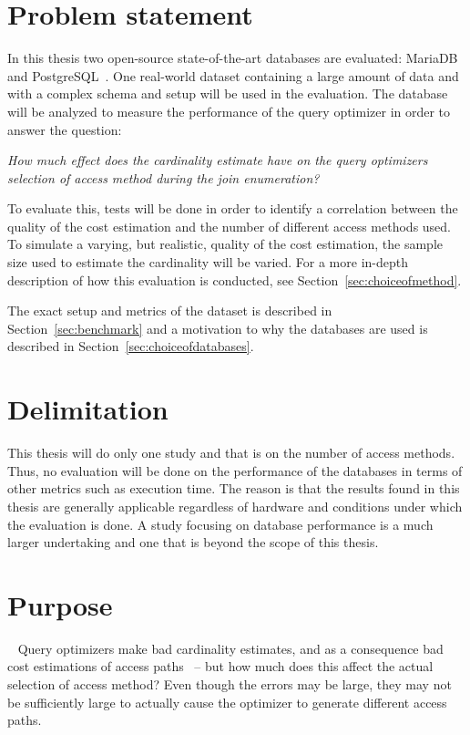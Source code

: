 \section{Problem statement}
In this thesis two open-source state-of-the-art databases are evaluated:
MariaDB~\cite{mariadb_m} and PostgreSQL~\cite{postgresql_ptwmaosd}. One
real-world dataset containing a large amount of data and with a complex schema
and setup will be used in the evaluation. The database will be analyzed to
measure the performance of the query optimizer in order to answer the question:

\textit{How much effect does the cardinality estimate have on the query optimizers
  selection of access method during the join enumeration?}

To evaluate this, tests will be done in order to identify a correlation between
the quality of the cost estimation and the number of different access methods
used. To simulate a varying, but realistic, quality of the cost estimation, the
sample size used to estimate the cardinality will be varied. For a more in-depth
description of how this evaluation is conducted, see Section~\ref{sec:choiceofmethod}.

The exact setup and metrics of the dataset is described in
Section~\ref{sec:benchmark} and a motivation to why the databases are used is
described in Section~\ref{sec:choiceofdatabases}.

\section{Delimitation}
This thesis will do only one study and that is on the number of access methods.
Thus, no evaluation will be done on the performance of the databases in terms of
other metrics such as execution time. The reason is that the results found in
this thesis are generally applicable regardless of hardware and conditions under
which the evaluation is done. A study focusing on database performance is a much
larger undertaking and one that is beyond the scope of this thesis.

\section{Purpose}~\label{sec:purpose}
Query optimizers make bad cardinality estimates, and as a consequence bad cost
estimations of access paths~\cite{leis_2015_how_hgaqor} – but how much does this
affect the actual selection of access method? Even though the errors may be large,
they may not be sufficiently large to actually cause the optimizer to generate
different access paths.

